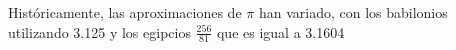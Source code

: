 \documentclass[preview]{standalone}
\begin{document}
\begin{center}
Históricamente, las aproximaciones de $\pi$ han variado, con los babilonios utilizando 3.125 y los egipcios $\frac{256}{81}$ que es igual a 3.1604
\end{center}
\end{document}
